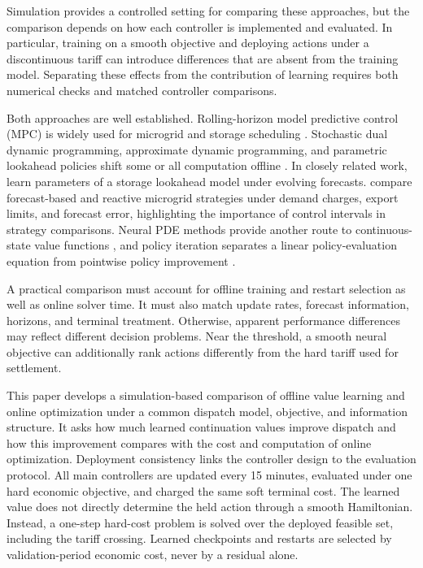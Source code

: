 \documentclass[preprint,11pt]{elsarticle}
\theoremstyle{plain}
\theoremstyle{remark}
\begin{document}
Simulation provides a controlled setting for comparing these approaches, but
the comparison depends on how each controller is implemented and evaluated.
In particular, training on a smooth objective and deploying actions under a
discontinuous tariff can introduce differences that are absent from the
training model. Separating these effects from the contribution of learning
requires both numerical checks and matched controller comparisons.

Both approaches are well established. Rolling-horizon model predictive control
(MPC) is widely
used for microgrid and storage scheduling \citep{Parisio2014,Zhang2022}.
Stochastic dual dynamic programming, approximate dynamic programming, and
parametric lookahead policies shift some or all computation offline
\citep{Pereira1991,Lohndorf2010,Jiang2015,Powell2019}. In closely related work,
\citet{Ghadimi2024} learn parameters of a storage lookahead model under evolving
forecasts. \citet{Gust2021} compare forecast-based and reactive microgrid
strategies under demand charges, export limits, and forecast error,
highlighting the importance of control intervals in strategy comparisons.
Neural PDE methods provide another route to
continuous-state value functions \citep{Sirignano2018,Raissi2019}, and policy
iteration separates a
linear policy-evaluation equation from pointwise policy improvement
\citep{Kerimkulov2020}.

A practical comparison must account for offline training and restart
selection as well as online solver time. It must also match update rates,
forecast information, horizons, and terminal treatment. Otherwise, apparent
performance differences may reflect different decision problems. Near the
threshold, a smooth neural objective can additionally rank actions differently
from the hard tariff used for settlement.

This paper develops a simulation-based comparison of offline value learning
and online optimization under a common dispatch model, objective, and
information structure. It asks how much learned continuation values improve
dispatch and how this improvement compares with the cost and computation of
online optimization. Deployment consistency links the controller design to
the evaluation protocol. All
main controllers are updated every 15 minutes, evaluated under one hard
economic objective, and charged the same soft terminal cost. The learned value
does not directly determine the held action through a smooth Hamiltonian.
Instead, a one-step hard-cost problem is solved over the deployed feasible set,
including the tariff crossing. Learned checkpoints and restarts are selected
by validation-period economic cost, never by a residual alone.
\end{document}
